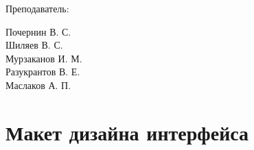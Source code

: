\documentclass[a4paper, 14pt]{article}
\begin{document}
\begin{titlepage}
\begin{multicols}{2}
\begin{flushright}
            {Преподаватель:\\}

        \end{flushright}
        \begin{flushright}

            {Почернин В. С.}\\
            {Шиляев В. С.}\\
            {Мурзаканов И. М.}\\
            {Разукрантов В. Е.}\\[0.5cm]


            Маслаков А. П.\\

        \end{flushright}
    \end{multicols}

    \flushright{
        {\phantom{qwe}}\\[0.5cm]
    }

    \vfill
\end{titlepage}

\Large
\tableofcontents
\newpage
\large

\section{Макет дизайна интерфейса}
\end{document}
